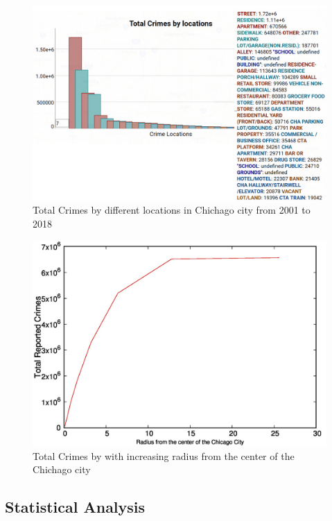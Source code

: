 \begin{figure}[htb]
	\centering\includegraphics[width=\columnwidth]{images/geo3.jpg}
	\caption{Total Crimes by different locations in Chichago city from 2001 to 2018}\label{fig:year-top10crimes-local-geo3}
\end{figure}

\begin{figure}[htb]
	\centering\includegraphics[width=\columnwidth]{images/geo4.jpg}
	\caption{Total Crimes by with increasing radius from the center of the Chichago city}\label{fig:crimes-with-radius-geo4}
\end{figure}

\subsection{Statistical Analysis}

